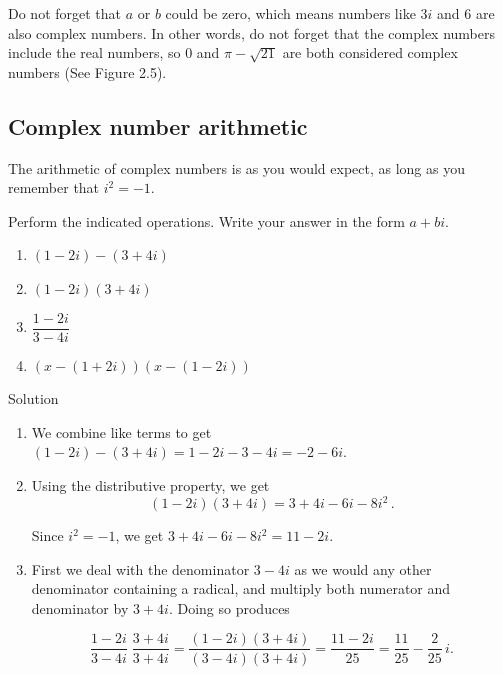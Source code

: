 Do not forget that $a$ or $b$ could be zero, which means numbers like $3i$ and $6$ are also complex numbers.  In other words, do not forget that the complex numbers include the real numbers, so $0$ and $\pi - \sqrt{21}$ are both considered complex numbers (See Figure 2.5). 

\subsection{Complex number arithmetic}
The arithmetic of complex numbers is as you would expect, as long as you remember that $i^2=-1$.

\begin{example} 
	\label{complexzeroex1} Perform the indicated operations.  Write your answer in the form $a+bi$.
	\begin{multicols}{2}
		
		
		\begin{enumerate}
			
			\item  $(1-2i) - (3+4i)$
			\item  $(1-2i)(3+4i)$ 
			\item  $\dfrac{1-2i}{3-4i}$
			\item  $\left(x-(1+2i)\right)\left(x-(1-2i)\right)$
			
		\end{enumerate}
	\end{multicols}
	
	Solution 
	
	\begin{enumerate}
		
		\item We combine like terms to get $(1-2i) - (3+4i) = 1-2i-3-4i = -2-6i$.
		
		
		\item  Using the distributive property, we get  
		$$
		(1-2i)(3+4i) =3+4i-6i-8i^2\,.
		$$
		
		Since $i^2=-1$, we get $3+4i-6i-8i^2 =  11-2i$.
		
		\item  First we deal with the denominator $3-4i$ as we would any other denominator containing a radical, and multiply both numerator and denominator by $3+4i$.  Doing so produces
		
		\[ \dfrac{1-2i}{3-4i} \;  \dfrac{3+4i}{3+4i} = \dfrac{(1-2i)(3+4i)}{(3-4i)(3+4i)} = \dfrac{11-2i}{25} = \dfrac{11}{25} - \dfrac{2}{25} \, i.\]
		

\end{enumerate}
\end{example}
